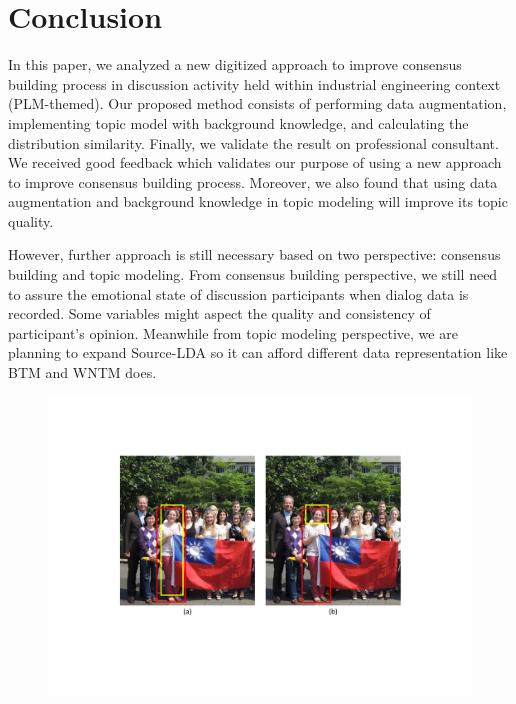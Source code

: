 \documentclass[senior]{IPSstyle}
\begin{document}
\chapter{Conclusion} 

In this paper, we analyzed a new digitized approach to improve consensus building process in discussion activity held within industrial engineering context (PLM-themed). Our proposed method consists of performing data augmentation, implementing topic model with background knowledge, and calculating the distribution similarity. Finally, we validate the result on professional consultant. We received good feedback which validates our purpose of using a new approach to improve consensus building process. Moreover, we also found that using data augmentation and background knowledge in topic modeling will improve its topic quality.

However, further approach is still necessary based on two perspective: consensus building and topic modeling. From consensus building perspective, we still need to assure the emotional state of discussion participants when dialog data is recorded. Some variables might aspect the quality and consistency of participant’s opinion. Meanwhile from topic modeling perspective, we are planning to expand Source-LDA so it can afford different data representation like BTM and WNTM does.

\begin{figure}[t]
    \begin{center}
    \includegraphics[width=0.97\linewidth]{images/start.pdf}
    \end{center}
\vspace{-0.3cm}
    \caption{ }
    \label{fintro}
    \vspace{-0.3cm}
\end{figure} 



\end{document}
